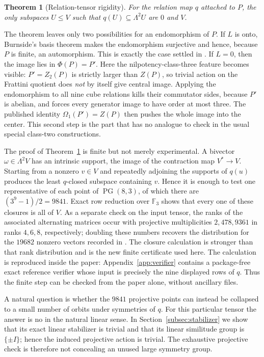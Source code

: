 \documentclass[11pt]{amsart}
\newtheorem{theorem}{Theorem}[section]
\theoremstyle{definition}
\theoremstyle{remark}
\newcommand{\F}{\mathbb F}
\newcommand{\PG}{\operatorname{PG}}
\begin{document}
\begin{theorem}[Relation-tensor rigidity]\label{thm:intro-rigidity}
For the relation map $q$ attached to $P$, the only subspaces
$U\leq V$ such that $q(U)\subseteq\Lambda^2U$ are $0$ and $V$.
\end{theorem}

The theorem leaves only two possibilities for an endomorphism of $P$.  If
$L$ is onto, Burnside's basis theorem makes the endomorphism surjective and
hence, because $P$ is finite, an automorphism.  This is exactly the case
settled in \cite[Theorem~1.2]{AFLObrien10}.  If $L=0$, then the image lies
in $\Phi(P)=P'$.  Here the nilpotency-class-three feature becomes visible:
$P'=Z_2(P)$ is strictly larger than $Z(P)$, so trivial action on the
Frattini quotient does \emph{not} by itself give central image.  Applying
the endomorphism to all nine cube relations kills their commutator sides,
because $P'$ is abelian, and forces every generator image to have order at
most three.  The published identity
$\Omega_1(P')=Z(P)$ then pushes the whole image into the center.  This
second step is the part that has no analogue to check in the usual special
class-two constructions.

The proof of Theorem~\ref{thm:intro-rigidity} is finite but not merely
experimental.  A bivector $\omega\in\Lambda^2V$ has an intrinsic support,
the image of the contraction map $V^*\to V$.  Starting from a nonzero
$v\in V$ and repeatedly adjoining the supports of $q(u)$ produces the
least $q$-closed subspace containing $v$.  Hence it is enough to test one
representative of each point of $\PG(8,3)$, of which there are
$(3^9-1)/2=9841$.  Exact row reduction over $\F_3$ shows that every one of
these closures is all of $V$.  As a separate check on the input tensor, the
ranks of the associated alternating matrices occur with projective
multiplicities $2,478,9361$ in ranks $4,6,8$, respectively; doubling these
numbers recovers the distribution for the $19682$ nonzero vectors recorded
in \cite[p.~5]{AFLObrien10}.  The closure calculation is stronger than
that rank distribution and is the new finite certificate used here.  The
calculation is reproduced inside the paper: Appendix~\ref{app:verifier}
contains a package-free exact reference verifier whose input is precisely
the nine displayed rows of $q$.  Thus the finite step can be checked from
the paper alone, without ancillary files.

A natural question is whether the $9841$ projective points can instead be
collapsed to a small number of orbits under symmetries of $q$.  For this
particular tensor the answer is no in the natural linear sense.  In
Section~\ref{subsec:stabilizer} we show that its exact linear stabilizer is
trivial and that its linear similitude group is $\{\pm I\}$; hence the
induced projective action is trivial.  The exhaustive projective check is
therefore not concealing an unused large symmetry group.
\end{document}
